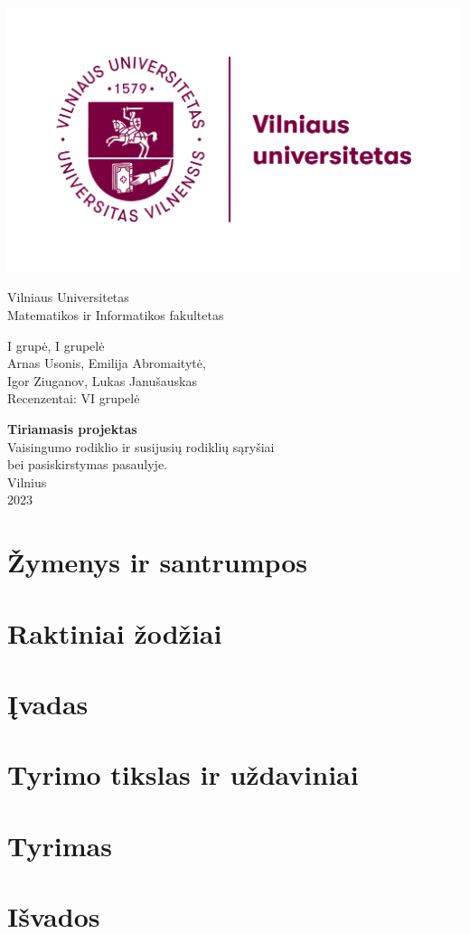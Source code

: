 \documentclass[12pt]{article}
\begin{document}
\begin{titlepage}
    \centering
    \includegraphics[width=.5\textwidth]{pic/vu_logo.png} \\
    {\Huge
    Vilniaus Universitetas \\
    Matematikos ir Informatikos fakultetas\par} 
    \vspace{2cm}
    
    \Large
    {I grupė, I grupelė \\
    Arnas Usonis, Emilija Abromaitytė, \\ Igor Ziuganov, Lukas Janušauskas \\
    Recenzentai: VI grupelė\par}
    \vspace{1cm}
    {\LARGE
    \textbf{Tiriamasis projektas \\}}
    \vspace{0.2cm}
    {\Large
    Vaisingumo rodiklio ir susijusių rodiklių sąryšiai \\ bei pasiskirstymas pasaulyje. \\}
    \vspace*{\fill}
    Vilnius \\ 2023
    
    
\end{titlepage}
\pagebreak

\normalsize
\tableofcontents
\pagebreak

\section{Žymenys ir santrumpos}


\section{Raktiniai žodžiai}


\section{Įvadas}


\section{Tyrimo tikslas ir uždaviniai}


\pagebreak
\section{Tyrimas}


\section{Išvados}

\end{document}
